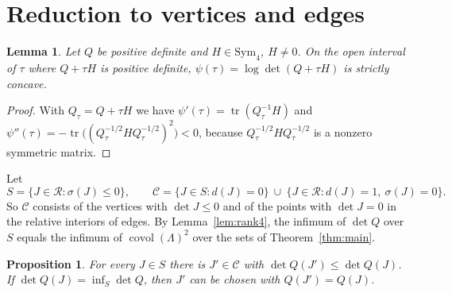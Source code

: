 \documentclass[11pt]{amsart}
\newtheorem{proposition}[theorem]{Proposition}
\newtheorem{lemma}[theorem]{Lemma}
\theoremstyle{definition}
\theoremstyle{remark}
\numberwithin{equation}{section}
\numberwithin{table}{section}
\numberwithin{figure}{section}
\newcommand{\Rk}{\mathcal{R}}
\newcommand{\Sym}{\mathrm{Sym}}
\newcommand{\covol}{\operatorname{covol}}
\newcommand{\cand}{\mathcal{C}}
\begin{document}
\section{Reduction to vertices and edges}\label{sec:reduction}

\begin{lemma}\label{lem:logdet}
Let $Q$ be positive definite and $H\in\Sym_4$, $H\ne0$. On the open interval of $\tau$ where $Q+\tau H$ is positive definite, $\psi(\tau)=\log\det(Q+\tau H)$ is strictly concave.
\end{lemma}

\begin{proof}
With $Q_\tau=Q+\tau H$ we have $\psi'(\tau)=\operatorname{tr}(Q_\tau^{-1}H)$ and $\psi''(\tau)=-\operatorname{tr}\bigl((Q_\tau^{-1/2}HQ_\tau^{-1/2})^2\bigr)<0$, because $Q_\tau^{-1/2}HQ_\tau^{-1/2}$ is a nonzero symmetric matrix.
\end{proof}

Let
\[
S=\{J\in\Rk:\sigma(J)\le0\},\qquad
\cand=\{J\in S: d(J)=0\}\ \cup\ \{J\in\Rk: d(J)=1,\ \sigma(J)=0\}.
\]
So $\cand$ consists of the vertices with $\det J\le0$ and of the points with $\det J=0$ in the relative interiors of edges. By Lemma~\ref{lem:rank4}, the infimum of $\det Q$ over $S$ equals the infimum of $\covol(\Lambda)^2$ over the sets of Theorem~\ref{thm:main}.

\begin{proposition}\label{prop:descent}
For every $J\in S$ there is $J'\in\cand$ with $\det Q(J')\le\det Q(J)$. If $\det Q(J)=\inf_S\det Q$, then $J'$ can be chosen with $Q(J')=Q(J)$.
\end{proposition}
\end{document}
